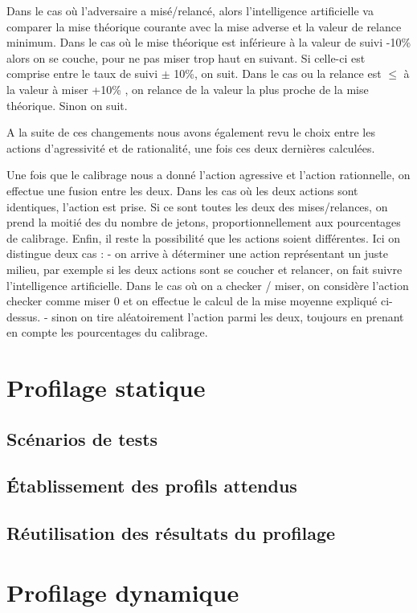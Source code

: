 \documentclass{report}
\begin{document}
Dans le cas où l'adversaire a misé/relancé, alors l'intelligence artificielle va comparer la mise théorique courante avec la mise adverse et la valeur de relance minimum. Dans le cas où le mise théorique est inférieure à la valeur de suivi -10\% alors on se couche, pour ne  pas miser trop haut en suivant. Si celle-ci est comprise entre le taux de suivi $\pm$ 10\%, on suit.
Dans le cas ou la relance est $\leq$ à la valeur à miser +10\% , on relance de la valeur la plus proche de la mise théorique. Sinon on suit.\par


A la suite de ces changements nous avons également revu le choix entre les actions d'agressivité et de rationalité, une fois ces deux dernières calculées.\par

Une fois que le calibrage nous a donné l'action agressive et l'action rationnelle, on effectue une fusion entre les deux. Dans les cas où les deux actions sont identiques, l'action est prise. Si ce sont toutes les deux des mises/relances, on prend la moitié des du nombre de jetons, proportionnellement aux pourcentages de calibrage.
Enfin, il reste la possibilité que les actions soient différentes. Ici on distingue deux cas :
- on arrive à déterminer une action représentant un juste milieu, par exemple si les deux actions sont se coucher et relancer, on fait suivre l'intelligence artificielle. Dans le cas où on a checker / miser, on considère l'action checker comme miser 0 et on effectue le calcul de la mise moyenne expliqué ci-dessus.
- sinon on tire aléatoirement l'action parmi les deux, toujours en prenant en compte les pourcentages du calibrage.

\section{Profilage statique}
\subsection{Scénarios de tests}
\subsection{Établissement des profils attendus}
\subsection{Réutilisation des résultats du profilage}

\section{Profilage dynamique}
\end{document}
